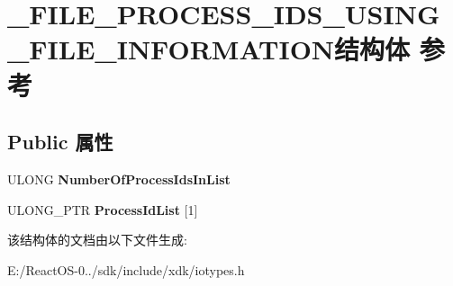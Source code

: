 \hypertarget{struct___f_i_l_e___p_r_o_c_e_s_s___i_d_s___u_s_i_n_g___f_i_l_e___i_n_f_o_r_m_a_t_i_o_n}{}\section{\+\_\+\+F\+I\+L\+E\+\_\+\+P\+R\+O\+C\+E\+S\+S\+\_\+\+I\+D\+S\+\_\+\+U\+S\+I\+N\+G\+\_\+\+F\+I\+L\+E\+\_\+\+I\+N\+F\+O\+R\+M\+A\+T\+I\+O\+N结构体 参考}
\label{struct___f_i_l_e___p_r_o_c_e_s_s___i_d_s___u_s_i_n_g___f_i_l_e___i_n_f_o_r_m_a_t_i_o_n}
\subsection*{Public 属性}
\begin{DoxyCompactItemize}
\item 
\mbox{\label{struct___f_i_l_e___p_r_o_c_e_s_s___i_d_s___u_s_i_n_g___f_i_l_e___i_n_f_o_r_m_a_t_i_o_n_ad5c7f7e6eae001335753ae4df1e6c9db}} 
U\+L\+O\+NG {\bfseries Number\+Of\+Process\+Ids\+In\+List}
\item 
\mbox{\label{struct___f_i_l_e___p_r_o_c_e_s_s___i_d_s___u_s_i_n_g___f_i_l_e___i_n_f_o_r_m_a_t_i_o_n_a4f1e28d59f14b8c405ecaaa40ed709ca}} 
U\+L\+O\+N\+G\+\_\+\+P\+TR {\bfseries Process\+Id\+List} \mbox{[}1\mbox{]}
\end{DoxyCompactItemize}


该结构体的文档由以下文件生成\+:\begin{DoxyCompactItemize}
\item 
E\+:/\+React\+O\+S-\/0../sdk/include/xdk/iotypes.\+h\end{DoxyCompactItemize}
